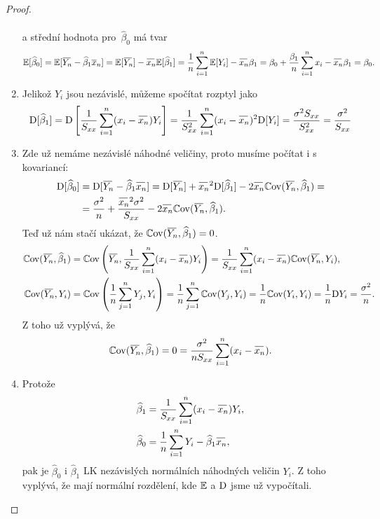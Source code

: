 \begin{theorem}
\begin{proof}
\begin{enumerate}
\begin{equation*}
\begin{aligned}
  		    \end{aligned}
  		\end{equation*}
  		a střední hodnota pro~$\widehat{\beta}_0$ má tvar
  		\begin{equation*}
  		\begin{aligned}
  		    \E [\widehat{\beta}_0] = \E [\oyn - \widehat{\beta}_1 \overline{x}_n] = \E [\oyn] - \oxnn \E [\widehat{\beta}_1] = \frac{1}{n} \sumin \E [Y_i] - \oxnn \beta_1 = \beta_0 + \frac{\beta_1}{n} \sumin x_i - \oxnn \beta_1 = \beta_0.
  		    \end{aligned}
  		\end{equation*}
  \item 
  Jelikož $Y_i$ jsou nezávislé, můžeme spočítat rozptyl jako
  \begin{equation*}
  			\D [\widehat{\beta}_1] = \D \left[\frac{1}{\Sxx} \sumin (x_i - \oxnn) Y_i \right] = \frac{1}{\Sxx^2} \sumin (x_i - \oxnn)^2 \D [Y_i] = \frac{\sigma^2 \Sxx}{\Sxx^2} = \frac{\sigma^2}{\Sxx}
  		\end{equation*}
  \item  
  Zde už nemáme nezávislé náhodné veličiny, proto musíme počítat i s kovariancí:
  \begin{equation*}
  \begin{aligned}
 \D [\widehat{\beta}_0] & = \D [\oyn - \widehat{\beta}_1 \oxnn] = \D [\oyn] + \oxnn^2 \D [\widehat{\beta}_1] - 2 \oxnn \Cov(\oyn, \widehat{\beta}_1) = \\
  	& = \frac{\sigma^2}{n} + \frac{\oxnn^2 \sigma^2 }{\Sxx} - 2 \oxnn \Cov(\oyn,  \widehat{\beta}_1). 
  	\end{aligned}
  	\end{equation*}
  	Teď už nám stačí ukázat, že $\Cov(\oyn,  \widehat{\beta}_1) = 0$.
  	\begin{equation*}
  	\begin{aligned}
\Cov(\oyn,  \widehat{\beta}_1) & = \Cov \left(\oyn, \frac{1}{\Sxx} \sumin (x_i - \oxnn) Y_i \right) = \frac{1}{\Sxx} \sumin (x_i - \oxnn) \Cov (\oyn, Y_i),  \\
\Cov (\oyn, Y_i) & = \Cov \left(\frac{1}{n} \sumjn Y_j, Y_i\right) = \frac{1}{n} \sumjn \Cov (Y_j, Y_i) = \frac{1}{n} \Cov (Y_i, Y_i) = 	\frac{1}{n} \D Y_i = \frac{\sigma^2}{n}.	
  			\end{aligned}
  		\end{equation*}
  		Z toho už vyplývá, že $$\Cov(\oyn,  \widehat{\beta}_1) = 0 = \frac{\sigma^2}{n \Sxx} \sumin (x_i - \oxnn).$$
  \item Protože
  \begin{align*}
  \widehat{\beta}_1& = \frac{1}{\Sxx}\sumin (x_i-\oxnn)Y_i,\\\widehat{\beta}_0& = \frac{1}{n}\sumin Y_i - \widehat{\beta}_1 \oxnn,
  \end{align*}
  pak je $\widehat{\beta}_0$ i $\widehat{\beta}_1$ LK nezávislých normálních náhodných veličin $Y_i$. Z toho vyplývá, že mají normální rozdělení, kde $\mathbb{E}$ a $\mathrm{D}$ jsme už vypočítali.
\end{enumerate}
\end{proof}
\label{Veta1}
\end{theorem}
